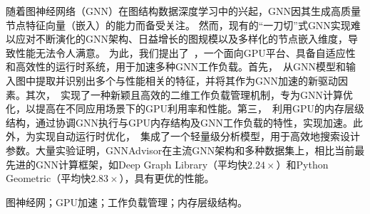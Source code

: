 \abstractch

随着图神经网络（GNN）在图结构数据深度学习中的兴起，GNN因其生成高质量节点特征向量（嵌入）的能力而备受关注。
然而，现有的“一刀切”式GNN实现难以应对不断演化的GNN架构、日益增长的图规模以及多样化的节点嵌入维度，导致性能无法令人满意。
为此，我们提出了~\Mname{}，一个面向GPU平台、具备自适应性和高效性的运行时系统，用于加速多种GNN工作负载。首先，~\Mname{}从GNN模型和输入图中提取并识别出多个与性能相关的特征，并将其作为GNN加速的新驱动因素。其次，~\Mname{}实现了一种新颖且高效的二维工作负载管理机制，专为GNN计算优化，以提高在不同应用场景下的GPU利用率和性能。第三，~\Mname{}利用GPU的内存层级结构，通过协调GNN执行与GPU内存结构及GNN工作负载的特性，实现加速。此外，为实现自动运行时优化，~\Mname{}集成了一个轻量级分析模型，用于高效地搜索设计参数。大量实验证明，GNNAdvisor在主流GNN架构和多种数据集上，相比当前最先进的GNN计算框架，如Deep Graph Library（平均快$2.24\times$）和Python Geometric（平均快$2.83\times$），具有更优的性能。

\vspace{5pt}

\keywordsch 图神经网；GPU加速；工作负载管理；内存层级结构。
